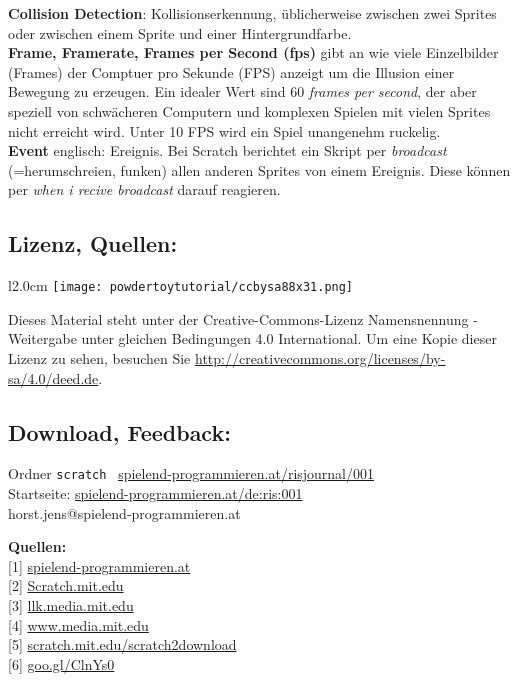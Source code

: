 \documentclass[10pt,a4paper,ngerman,twoside]{article} %
\begin{document}
\textbf{Collision Detection}: Kollisionserkennung, üblicherweise zwischen zwei Sprites oder zwischen einem Sprite und einer Hintergrundfarbe. \\

\textbf{Frame, Framerate, Frames per Second (fps)} gibt an wie viele Einzelbilder (Frames) der Comptuer pro Sekunde (FPS) anzeigt um die Illusion einer Bewegung zu erzeugen. Ein idealer Wert sind 60 \textit{frames per second}, der aber speziell von schwächeren Computern und komplexen Spielen mit vielen Sprites nicht erreicht wird. Unter 10 FPS wird ein Spiel unangenehm ruckelig. \\

\textbf{Event} englisch: Ereignis. Bei Scratch berichtet ein Skript per \textit{broadcast} (=herumschreien, funken) allen anderen Sprites von einem Ereignis. Diese können per \textit{when i recive broadcast} darauf reagieren. \\


\subsection*{Lizenz, Quellen:}
\begin{wrapfigure}{l}{2.0cm}
\texttt{[image: powdertoytutorial/ccbysa88x31.png]}
\end{wrapfigure}
Dieses Material steht unter der Creative-Commons-Lizenz Namensnennung - Weitergabe unter gleichen Bedingungen 4.0 International. Um eine Kopie dieser Lizenz zu sehen, besuchen Sie \url{http://creativecommons.org/licenses/by-sa/4.0/deed.de}.

\subsection*{Download, Feedback:}
\footnotesize{
Ordner \texttt{scratch} \Mundus\ \href{http://spielend-programmieren.at/risjournal/001}{spielend-programmieren.at/risjournal/001}\\
Startseite: \href{http://spielend-programmieren.at/de:ris:001}{spielend-programmieren.at/de:ris:001}\\ 
\Letter\:  horst.jens@spielend-programmieren.at \\}
\normalsize{}

\textbf{Quellen:} \\
{[}1{]} \href{http://spielend-programmieren.at}{spielend-programmieren.at}\\
{[}2{]} \href{http://scratch.mit.edu}{Scratch.mit.edu}\\
{[}3{]} \href{http://llk.media.mit.edu/}{llk.media.mit.edu}\\
{[}4{]} \href{http://www.media.mit.edu/}{www.media.mit.edu}\\
{[}5{]} \href{http://scratch.mit.edu/scratch2download/}{scratch.mit.edu/scratch2download}\\
{[}6{]} \href{http://spielend-programmieren.at/en:tutorials:centralperspective}{goo.gl/ClnYs0} \\
\end{document}
